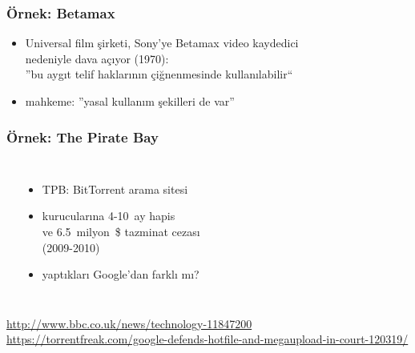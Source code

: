 \documentclass[dvipsnames]{beamer}
\theoremstyle{plain}
\begin{document}
\begin{frame}
  \frametitle{Örnek: Betamax}

  \begin{itemize}
    \item Universal film şirketi, Sony'ye Betamax video kaydedici\\
      nedeniyle dava açıyor (1970):\\
      ''bu aygıt telif haklarının çiğnenmesinde kullanılabilir``
    \item mahkeme: ''yasal kullanım şekilleri de var''
  \end{itemize}
\end{frame}

\begin{frame}
  \frametitle{Örnek: The Pirate Bay}

  \begin{columns}
    \begin{center}
    \end{center}

    \begin{itemize}
      \item TPB: BitTorrent arama sitesi
      \item kurucularına 4-10~ay hapis\\
        ve 6.5~milyon~\$ tazminat cezası\\
        (2009-2010)

      \pause
      \medskip
      \item yaptıkları Google'dan farklı mı?
    \end{itemize}
  \end{columns}

  \medskip
  \tiny{\url{http://www.bbc.co.uk/news/technology-11847200}}\\
  \tiny{\url{https://torrentfreak.com/google-defends-hotfile-and-megaupload-in-court-120319/}}\\
\end{frame}
\end{document}
